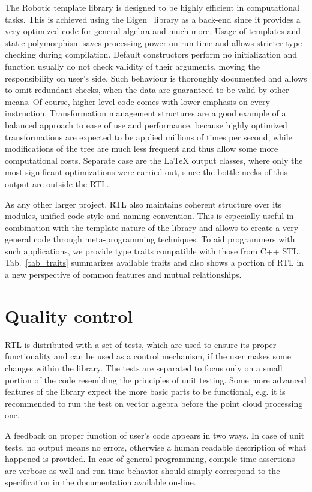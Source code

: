 \documentclass[
    letterpaper, 
    10 pt, 
    conference,
    table,
]{ieeeconf}
\begin{document}
The Robotic template library is designed to be highly efficient in computational tasks. This is achieved using the Eigen~\cite{eigen} library as a back-end since it provides a very optimized code for general algebra and much more. Usage of templates and static polymorphism saves processing power on run-time and allows stricter type checking during compilation. Default constructors perform no initialization and function usually do not check validity of their arguments, moving the responsibility on user's side. Such behaviour is thoroughly documented and allows to omit redundant checks, when the data are guaranteed to be valid by other means. Of course, higher-level code comes with lower emphasis on every instruction. Transformation management structures are a good example of a balanced approach to ease of use and performance, because highly optimized transformations are expected to be applied millions of times per second, while modifications of the tree are much less frequent and thus allow some more computational costs. Separate case are the LaTeX output classes, where only the most significant optimizations were carried out, since the bottle necks of this output are outside the RTL.

As any other larger project, RTL also maintains coherent structure over its modules, unified code style and naming convention. This is especially useful in combination with the template nature of the library and allows to create a very general code through meta-programming techniques. To aid programmers with such applications, we provide type traits compatible with those from C++ STL. Tab.~\ref{tab_traits} summarizes available traits and also shows a portion of RTL in a new perspective of common features and mutual relationships.

\section*{Quality control}

RTL is distributed with a set of tests, which are used to ensure its proper functionality and can be used as a control mechanism, if the user makes some changes within the library. The tests are separated to focus only on a small portion of the code resembling the principles of unit testing. Some more advanced features of the library expect the more basic parts to be functional, e.g. it is recommended to run the test on vector algebra before the point cloud processing one.

A feedback on proper function of user's code appears in two ways. In case of unit tests, no output means no errors, otherwise a human readable description of what happened is provided. In case of general programming, compile time assertions are verbose as well and run-time behavior should simply correspond to the specification in the documentation available on-line. 
\end{document}
